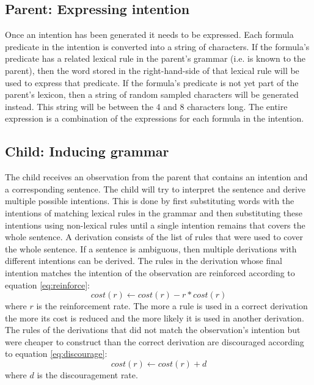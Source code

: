 \documentclass[a4paper]{article}
\begin{document}
\subsection{Parent: Expressing intention}
Once an intention has been generated it needs to be expressed. Each formula predicate in the intention is converted into a string of characters. If the formula's predicate has a related lexical rule in the parent's grammar (i.e. is known to the parent), then the word stored in the right-hand-side of that lexical rule will be used to express that predicate. If the formula's predicate is not yet part of the parent's lexicon, then a string of random sampled characters will be generated instead. This string will be between the 4 and 8 characters long. The entire expression is a combination of the expressions for each formula in the intention.

\subsection{Child: Inducing grammar} %
The child receives an observation from the parent that contains an intention and a corresponding sentence. The child will try to interpret the sentence and derive multiple possible intentions. This is done by first substituting words with the intentions of matching lexical rules in the grammar and then substituting these intentions using non-lexical rules until a single intention remains that covers the whole sentence. A derivation consists of the list of rules that were used to cover the whole sentence. If a sentence is ambiguous, then multiple derivations with different intentions can be derived. The rules in the derivation whose final intention matches the intention of the observation are reinforced according to equation \ref{eq:reinforce}:
\begin{equation}
cost(r) \leftarrow cost(r) - r*cost(r)
\label{eq:reinforce}
\end{equation}
where $r$ is the reinforcement rate. The more a rule is used in a correct derivation the more its cost is reduced and the more likely it is used in another derivation. The rules of the derivations that did not match the observation's intention but were cheaper to construct than the correct derivation are discouraged according to equation \ref{eq:discourage}:
\begin{equation}
cost(r) \leftarrow cost(r) + d
\label{eq:discourage}
\end{equation}
where $d$ is the discouragement rate.
\end{document}
